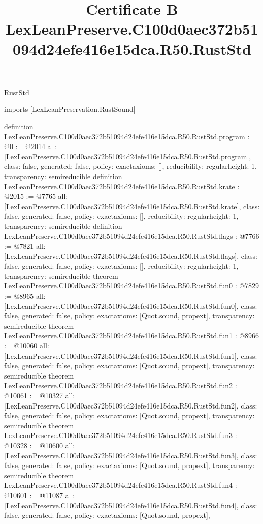 \begin{lexlean}{RustStd}
\title{Certificate B LexLeanPreserve.C100d0aec372b51094d24efe416e15dca.R50.RustStd}
\begin{coremodule}
imports [LexLeanPreservation.RustSound]

definition LexLeanPreserve.C100d0aec372b51094d24efe416e15dca.R50.RustStd.program : @0 := @2014 {
  all: [LexLeanPreserve.C100d0aec372b51094d24efe416e15dca.R50.RustStd.program],
  class: false,
  generated: false,
  policy: exact{axioms: []},
  reducibility: regular{height: 1},
  transparency: semireducible
}
definition LexLeanPreserve.C100d0aec372b51094d24efe416e15dca.R50.RustStd.krate : @2015 := @7765 {
  all: [LexLeanPreserve.C100d0aec372b51094d24efe416e15dca.R50.RustStd.krate],
  class: false,
  generated: false,
  policy: exact{axioms: []},
  reducibility: regular{height: 1},
  transparency: semireducible
}
definition LexLeanPreserve.C100d0aec372b51094d24efe416e15dca.R50.RustStd.flags : @7766 := @7821 {
  all: [LexLeanPreserve.C100d0aec372b51094d24efe416e15dca.R50.RustStd.flags],
  class: false,
  generated: false,
  policy: exact{axioms: []},
  reducibility: regular{height: 1},
  transparency: semireducible
}
theorem LexLeanPreserve.C100d0aec372b51094d24efe416e15dca.R50.RustStd.fun0 : @7829 := @8965 {
  all: [LexLeanPreserve.C100d0aec372b51094d24efe416e15dca.R50.RustStd.fun0],
  class: false,
  generated: false,
  policy: exact{axioms: [Quot.sound, propext]},
  transparency: semireducible
}
theorem LexLeanPreserve.C100d0aec372b51094d24efe416e15dca.R50.RustStd.fun1 : @8966 := @10060 {
  all: [LexLeanPreserve.C100d0aec372b51094d24efe416e15dca.R50.RustStd.fun1],
  class: false,
  generated: false,
  policy: exact{axioms: [Quot.sound, propext]},
  transparency: semireducible
}
theorem LexLeanPreserve.C100d0aec372b51094d24efe416e15dca.R50.RustStd.fun2 : @10061 := @10327 {
  all: [LexLeanPreserve.C100d0aec372b51094d24efe416e15dca.R50.RustStd.fun2],
  class: false,
  generated: false,
  policy: exact{axioms: [Quot.sound, propext]},
  transparency: semireducible
}
theorem LexLeanPreserve.C100d0aec372b51094d24efe416e15dca.R50.RustStd.fun3 : @10328 := @10600 {
  all: [LexLeanPreserve.C100d0aec372b51094d24efe416e15dca.R50.RustStd.fun3],
  class: false,
  generated: false,
  policy: exact{axioms: [Quot.sound, propext]},
  transparency: semireducible
}
theorem LexLeanPreserve.C100d0aec372b51094d24efe416e15dca.R50.RustStd.fun4 : @10601 := @11087 {
  all: [LexLeanPreserve.C100d0aec372b51094d24efe416e15dca.R50.RustStd.fun4],
  class: false,
  generated: false,
  policy: exact{axioms: [Quot.sound, propext]},
}
\end{coremodule}
\end{lexlean}
